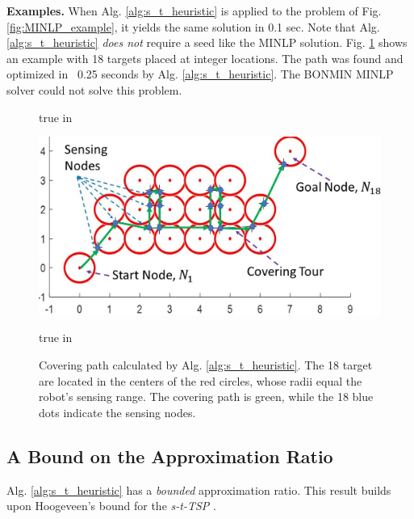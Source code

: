 \documentclass[letterpaper, 10 pt, conference]{ieeeconf}
\theoremstyle{definition}
\begin{document}
{\bf Examples.} When Alg. \ref{alg:s_t_heuristic} is applied to the problem of Fig. \ref{fig:MINLP_example}, it yields the same solution in 0.1 sec.  Note that Alg. \ref{alg:s_t_heuristic} {\em does not} require a seed like the MINLP solution. Fig. \ref{fig:ManyDisjointNodes} shows an example with 18 targets placed at integer locations.  The path was found and optimized in ~0.25 seconds by Alg. \ref{alg:s_t_heuristic}.  The BONMIN MINLP solver could not solve this problem.
%
\begin{figure}[h]
 true in
    \centerline{
    \includegraphics[height=1.5 true in]{ManyDisjointNodes.jpg}
    }
    \caption{Covering path calculated by Alg. \ref{alg:s_t_heuristic}.
      The 18 target are located in the centers of the red circles, whose radii equal the robot's sensing range.  The covering path is green, while the 18 blue dots indicate the sensing nodes.}
    \label{fig:ManyDisjointNodes}
     true in
\end{figure}

\subsection{A Bound on the Approximation Ratio}\label{sec:competitiveness}

\noindent Alg. \ref{alg:s_t_heuristic} has a {\em bounded} approximation ratio.  This result builds upon Hoogeveen's bound for the {\em s-t-TSP}  \cite{hoogeveen_analysis_1991}.
\end{document}
